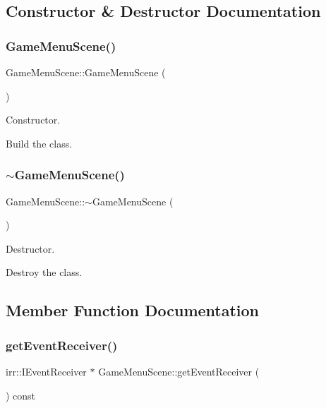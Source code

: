 \subsection{Constructor \& Destructor Documentation}
\mbox{\label{classGameMenuScene_a990633f8037ab2691f0aca251f3d89ee}} 
\subsubsection{\texorpdfstring{Game\+Menu\+Scene()}{GameMenuScene()}}
{\footnotesize\ttfamily Game\+Menu\+Scene\+::\+Game\+Menu\+Scene (\begin{DoxyParamCaption}{ }\end{DoxyParamCaption})}



Constructor. 

Build the class. \mbox{\label{classGameMenuScene_afbc6eddfe5f84b6f0b21bc652c9fc435}} 
\subsubsection{\texorpdfstring{$\sim$\+Game\+Menu\+Scene()}{~GameMenuScene()}}
{\footnotesize\ttfamily Game\+Menu\+Scene\+::$\sim$\+Game\+Menu\+Scene (\begin{DoxyParamCaption}{ }\end{DoxyParamCaption})}



Destructor. 

Destroy the class. 

\subsection{Member Function Documentation}
\mbox{\label{classGameMenuScene_adcb01430b24486c4e5d0157fc32d7611}} 
\subsubsection{\texorpdfstring{get\+Event\+Receiver()}{getEventReceiver()}}
{\footnotesize\ttfamily irr\+::\+I\+Event\+Receiver $\ast$ Game\+Menu\+Scene\+::get\+Event\+Receiver (\begin{DoxyParamCaption}{ }\end{DoxyParamCaption}) const\hspace{0.3cm}{\ttfamily [virtual]}}



